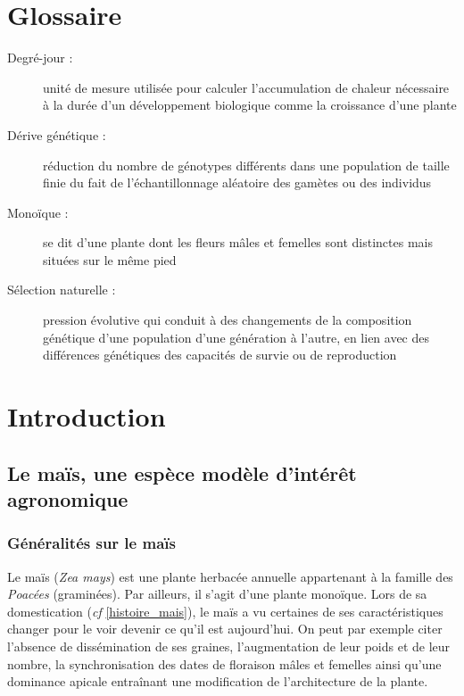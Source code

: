 \documentclass[12pt,a4paper]{article}
\begin{document}
	\tableofcontents
	\listoffigures
	\newpage
	
	\section*{Glossaire}
		\begin{description}
			
			\item [Degré-jour :] unité de mesure utilisée pour calculer l'accumulation de chaleur nécessaire à la durée d'un développement biologique comme la croissance d'une plante
			
			\item [Dérive génétique :] réduction du nombre de génotypes différents dans une population de taille finie du fait de l'échantillonnage aléatoire des gamètes ou des individus
			
			\item [Monoïque :] se dit d'une plante dont les fleurs mâles et femelles sont distinctes mais situées sur le même pied
			
			\item [Sélection naturelle :] pression évolutive qui conduit à des changements de la composition génétique d'une population d'une génération à l'autre, en lien avec des différences génétiques des capacités de survie ou de reproduction
			
		
			
		\end{description}
		 
	
	\section{Introduction}
		\subsection{Le maïs, une espèce modèle d'intérêt agronomique}
			\subsubsection{Généralités sur le maïs}
				Le maïs (\textit{Zea mays}) est une plante herbacée annuelle appartenant à la famille des \emph{Poacées} (graminées). Par ailleurs, il s'agit d'une plante monoïque.
				Lors de sa domestication (\textit{cf} \ref{histoire_mais}), le maïs a vu certaines de ses caractéristiques changer pour le voir devenir ce qu'il est aujourd'hui. On peut par exemple citer l'absence de dissémination de ses graines, l'augmentation de leur poids et de leur nombre, la synchronisation des dates de floraison mâles et femelles ainsi qu'une dominance apicale entraînant une modification de l'architecture de la plante.
				
\end{document}
